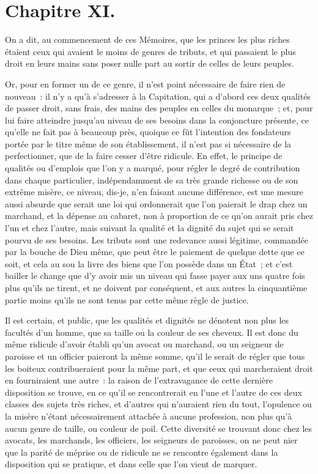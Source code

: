 \documentclass[french,twoside]{book} %
\begin{document}
\section[{Chapitre XI.}]{Chapitre XI.}
\noindent On a dit, au commencement de ces Mémoires, que les princes les plus riches étaient ceux qui avaient le moins de genres de tributs, et qui passaient le plus droit en leurs mains sans poser nulle part au sortir de celles de leurs peuples.\par
Or, pour en former un de ce genre, il n’est point nécessaire de faire rien de nouveau : il n’y a qu’à s’adresser à la Capitation, qui a d’abord ces deux qualités de passer droit, sans frais, des mains des peuples en celles du monarque ; et, pour lui faire atteindre jusqu’au niveau de ses besoins dans la conjoncture présente, ce qu’elle ne fait pas à beaucoup près, quoique ce fût l’intention des fondateurs portée par le titre même de son établissement, il n’est pas si nécessaire de la perfectionner, que de la faire cesser d’être ridicule. En effet, le principe de qualités ou d’emplois que l’on y a marqué, pour régler le degré de contribution dans chaque particulier, indépendamment de sa très grande richesse ou de son extrême misère, ce niveau, dis-je, n’en faisant aucune différence, est une mesure aussi absurde que serait une loi qui ordonnerait que l’on paierait le drap chez un marchand, et la dépense au cabaret, non à proportion de ce qu’on aurait pris chez l’un et chez l’autre, mais suivant la qualité et la dignité du sujet qui se serait pourvu de ses besoins. Les tributs sont une redevance aussi légitime, commandée par la bouche de Dieu même, que peut être le paiement de quelque dette que ce soit, et cela au sou la livre des biens que l’on possède dans un État ; et c’est bailler le change que d’y avoir mis un niveau qui fasse payer aux uns quatre fois plus qu’ils ne tirent, et ne doivent par conséquent, et aux autres la cinquantième partie moins qu’ils ne sont tenus par cette même règle de justice.\par
Il est certain, et public, que les qualités et dignités ne dénotent non plus les facultés d’un homme, que sa taille ou la couleur de ses cheveux. Il est donc du même ridicule d’avoir établi qu’un avocat ou marchand, ou un seigneur de paroisse et un officier paieront la même somme, qu’il le serait de régler que tous les boiteux contribueraient pour la même part, et que ceux qui marcheraient droit en fourniraient une autre : la raison de l’extravagance de cette dernière disposition se trouve, en ce qu’il se rencontrerait en l’une et l’autre de ces deux classes des sujets très riches, et d’autres qui n’auraient rien du tout, l’opulence ou la misère n’étant nécessairement attachée à aucune profession, non plus qu’à aucun genre de taille, ou couleur de poil. Cette diversité se trouvant donc chez les avocats, les marchands, les officiers, les seigneurs de paroisses, on ne peut nier que la parité de méprise ou de ridicule ne se rencontre également dans la disposition qui se pratique, et dans celle que l’on vient de marquer.\par
\end{document}
